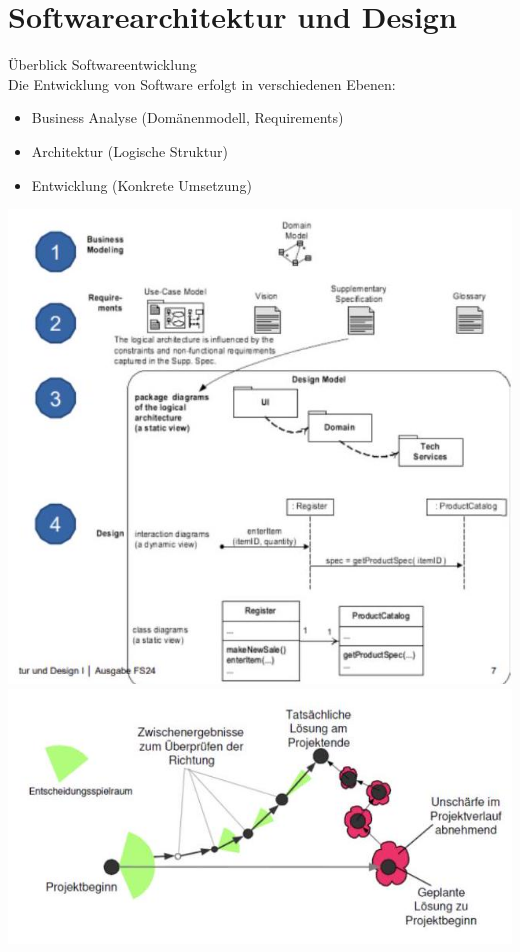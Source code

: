 \section{Softwarearchitektur und Design}

\begin{concept}{Überblick Softwareentwicklung}\\
Die Entwicklung von Software erfolgt in verschiedenen Ebenen:
\begin{itemize}
    \item Business Analyse (Domänenmodell, Requirements)
    \item Architektur (Logische Struktur)
    \item Entwicklung (Konkrete Umsetzung)
\end{itemize}
\includegraphics[width=0.9\linewidth]{images/2024_12_29_0d1d7b5551ea1b4b41bdg-07(2)}
\includegraphics[width=0.9\linewidth]{images/2024_12_29_0d1d7b5551ea1b4b41bdg-08(1)}
\end{concept}

